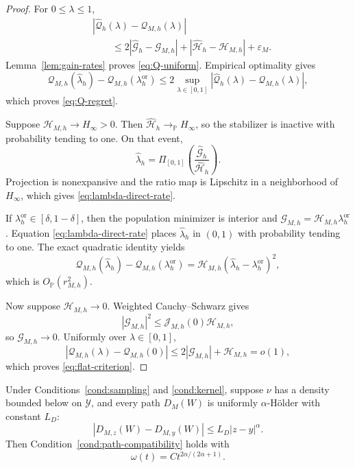 \begin{proof}
For \(0\le\lambda\le1\),
\[
\begin{aligned}
&|\widehat{\mathcal Q}_{h}(\lambda)-\mathcal Q_{M,h}(\lambda)|\\
&\qquad\le
2|\widehat{\mathcal G}_{h}-\mathcal G_{M,h}|
+
|\widehat{\mathcal H}_{h}-\mathcal H_{M,h}|
+
\varepsilon_M.
\end{aligned}
\]
Lemma~\ref{lem:gain-rates} proves \eqref{eq:Q-uniform}. Empirical optimality gives
\[
\mathcal Q_{M,h}(\widehat\lambda_h)
-
\mathcal Q_{M,h}(\lambda_h^{\mathrm{or}})
\le
2\sup_{\lambda\in[0,1]}
|\widehat{\mathcal Q}_{h}(\lambda)-\mathcal Q_{M,h}(\lambda)|,
\]
which proves \eqref{eq:Q-regret}.

Suppose \(\mathcal H_{M,h}\to H_\infty>0\). Then \(\widehat{\mathcal H}_{h}\to_{\mathbb P}H_\infty\), so the stabilizer is inactive with probability tending to one. On that event,
\[
\widehat\lambda_h
=
\Pi_{[0,1]}
\left(
\frac{\widehat{\mathcal G}_{h}}{\widehat{\mathcal H}_{h}}
\right).
\]
Projection is nonexpansive and the ratio map is Lipschitz in a neighborhood of \(H_\infty\), which gives \eqref{eq:lambda-direct-rate}.

If \(\lambda_h^{\mathrm{or}}\in[\delta,1-\delta]\), then the population minimizer is interior and \(\mathcal G_{M,h}=\mathcal H_{M,h}\lambda_h^{\mathrm{or}}\). Equation \eqref{eq:lambda-direct-rate} places \(\widehat\lambda_h\) in \((0,1)\) with probability tending to one. The exact quadratic identity yields
\[
\mathcal Q_{M,h}(\widehat\lambda_h)
-
\mathcal Q_{M,h}(\lambda_h^{\mathrm{or}})
=
\mathcal H_{M,h}
(\widehat\lambda_h-\lambda_h^{\mathrm{or}})^2,
\]
which is \(O_{\mathbb P}(r_{M,h}^2)\).

Now suppose \(\mathcal H_{M,h}\to0\). Weighted Cauchy--Schwarz gives
\[
|\mathcal G_{M,h}|^2
\le
\mathcal J_{M,h}(0)\mathcal H_{M,h},
\]
so \(\mathcal G_{M,h}\to0\). Uniformly over \(\lambda\in[0,1]\),
\[
|\mathcal Q_{M,h}(\lambda)-\mathcal Q_{M,h}(0)|
\le2|\mathcal G_{M,h}|+\mathcal H_{M,h}
=o(1),
\]
which proves \eqref{eq:flat-criterion}.
\end{proof}

\begin{lemma}
\label{lem:norm-comparison}
Under Conditions~\ref{cond:sampling} and \ref{cond:kernel}, suppose \(\nu\)
has a density bounded below on \(\mathcal Y\), and every path \(D_M(W)\) is
uniformly \(\alpha\)-H\"older with constant \(L_D\):
\[
|D_{M,z}(W)-D_{M,y}(W)|
\le L_D|z-y|^\alpha.
\]
Then Condition~\ref{cond:path-compatibility} holds with
\[
\omega(t)=Ct^{2\alpha/(2\alpha+1)}.
\]
\end{lemma}

